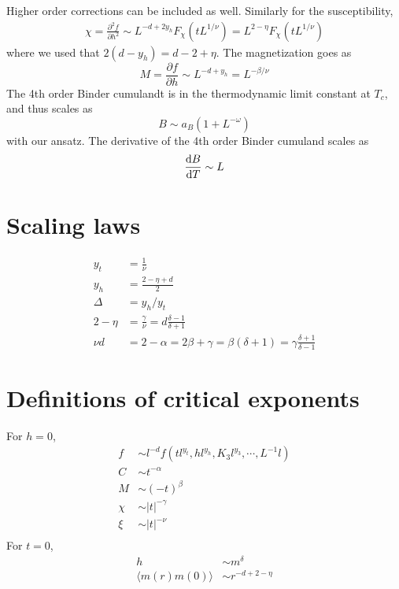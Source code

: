 Higher order corrections can be included as well.
Similarly for the susceptibility,
\begin{align}
  \chi = \frac{\partial^2 f}{\partial h^2}
  \sim L^{-d +2y_h}F_{\chi}(tL^{1/\nu}) = L^{2-\eta}F_{\chi}(tL^{1/\nu})
  \label{}
\end{align}
where we used that $ 2(d-y_h) = d -2 +\eta$.
The magnetization goes as
\begin{equation}
  M = \frac{\partial f}{\partial h} \sim L^{-d + y_h} = L^{-\beta/\nu}
  \label{}
\end{equation}
The 4th order Binder cumulandt is in the thermodynamic limit constant at $T_c$, and thus scales as 
\begin{equation}
  B \sim a_B(1+L^{-\omega})
  \label{}
\end{equation}
with our ansatz.
The derivative of the 4th order Binder cumuland scales as
\begin{equation}
  \frac{\textrm{d} B}{\textrm{d} T}\sim L
  \label{}
\end{equation}

\section{Scaling laws}
\begin{align}
  y_t &= \frac{1}{\nu}\\
  y_h &= \frac{2-\eta +d}{2}\\
  \Delta &= y_h/y_t\\
	2 - \eta &= \frac{\gamma}{\nu} = d\frac{\delta -1}{\delta+1}\\
	\nu d &= 2-\alpha = 2\beta + \gamma = \beta(\delta+1) = \gamma\frac{\delta +1}{\delta -1}
\end{align}
\section{Definitions of critical exponents}
For $h=0$,
\begin{align}
  f &\sim l^{-d}f(tl^{y_t},hl^{y_h},K_3l^{y_3},\cdots,L^{-1}l)\\
  C &\sim t^{-\alpha}\\
  M &\sim (-t)^{\beta}\\
  \chi &\sim |t|^{-\gamma}\\
  \xi &\sim |t|^{-\nu}\\
\end{align}  
For $t =0$,
\begin{align}
  h &\sim m^{\delta}\\
  \langle m(r)m(0)\rangle &\sim r^{-d +2 -\eta}
  \label{}
\end{align}
